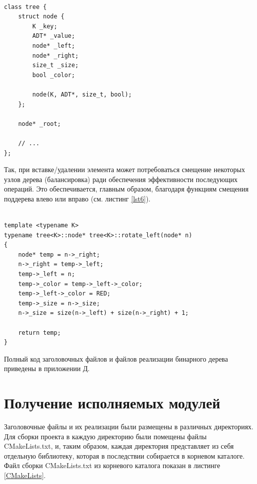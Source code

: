 \documentclass[a4paper,12pt]{article}
\begin{document}
\begin{lstlisting}[caption={Отрывок заголовочного файла для описания бинарного дерева},label=lst5]

class tree {
	struct node {
		K _key;
		ADT* _value;
		node* _left;
		node* _right;
		size_t _size;
		bool _color;
		
		node(K, ADT*, size_t, bool);
	};
	
	node* _root;
	
	// ...
};

\end{lstlisting}

Так, при вставке/удалении элемента может потребоваться смещение некоторых узлов дерева (балансировка) ради обеспечения эффективности последующих операций.
Это обеспечивается, главным образом, благодаря функциям смещения поддерева влево или вправо (см. листинг \ref{lst6}).
	
\begin{lstlisting}[caption={Функция смещения поддерева влево},label=lst6]

template <typename K>
typename tree<K>::node* tree<K>::rotate_left(node* n)
{
	node* temp = n->_right;
	n->_right = temp->_left;
	temp->_left = n;
	temp->_color = temp->_left->_color;
	temp->_left->_color = RED;
	temp->_size = n->_size;
	n->_size = size(n->_left) + size(n->_right) + 1;
	
	return temp;
}

\end{lstlisting}

Полный код заголовочных файлов и файлов реализации бинарного дерева приведены в приложении Д.

\cleardoublepage

\section{Получение исполняемых модулей}

Заголовочные файлы и их реализации были размещены в различных директориях.
Для сборки проекта в каждую директорию были помещены файлы CMakeLists.txt, и, таким образом, каждая директория представляет из себя отдельную библиотеку, которая в последствии собирается в корневом каталоге.
Файл сборки CMakeLists.txt из корневого каталога показан в листинге \ref{CMakeLists}.
\end{document}
